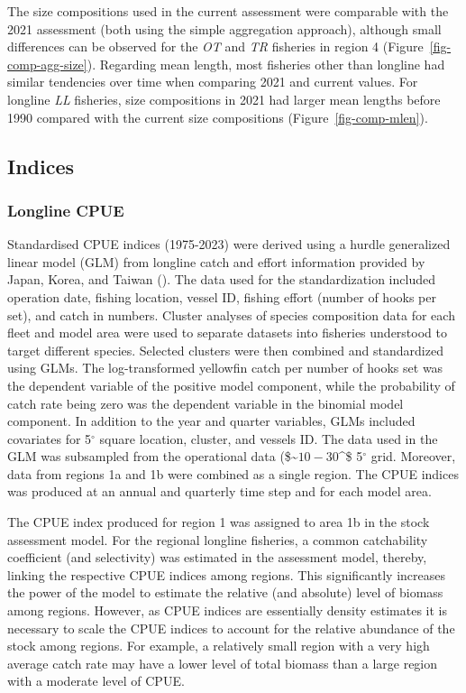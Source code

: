 \documentclass[
]{scrartcl}
\begin{document}
The size compositions used in the current assessment were comparable
with the 2021 assessment (both using the simple aggregation approach),
although small differences can be observed for the \emph{OT} and
\emph{TR} fisheries in region 4 (Figure~\ref{fig-comp-agg-size}).
Regarding mean length, most fisheries other than longline had similar
tendencies over time when comparing 2021 and current values. For
longline \emph{LL} fisheries, size compositions in 2021 had larger mean
lengths before 1990 compared with the current size compositions
(Figure~\ref{fig-comp-mlen}).

\subsection{Indices}\label{indices}

\subsubsection{Longline CPUE}\label{longline-cpue}

Standardised CPUE indices (1975-2023) were derived using a hurdle
generalized linear model (GLM) from longline catch and effort
information provided by Japan, Korea, and Taiwan
().
The data used for the standardization included operation date, fishing
location, vessel ID, fishing effort (number of hooks per set), and catch
in numbers. Cluster analyses of species composition data for each fleet
and model area were used to separate datasets into fisheries understood
to target different species. Selected clusters were then combined and
standardized using GLMs. The log-transformed yellowfin catch per number
of hooks set was the dependent variable of the positive model component,
while the probability of catch rate being zero was the dependent
variable in the binomial model component. In addition to the year and
quarter variables, GLMs included covariates for 5\(^\circ\) square
location, cluster, and vessels ID. The data used in the GLM was
subsampled from the operational data (\$\sim\(10-30%
\)\^{}\circ \times\$ 5\(^\circ\) grid. Moreover, data from regions 1a
and 1b were combined as a single region. The CPUE indices was produced
at an annual and quarterly time step and for each model area.

The CPUE index produced for region 1 was assigned to area 1b in the
stock assessment model. For the regional longline fisheries, a common
catchability coefficient (and selectivity) was estimated in the
assessment model, thereby, linking the respective CPUE indices among
regions. This significantly increases the power of the model to estimate
the relative (and absolute) level of biomass among regions. However, as
CPUE indices are essentially density estimates it is necessary to scale
the CPUE indices to account for the relative abundance of the stock
among regions. For example, a relatively small region with a very high
average catch rate may have a lower level of total biomass than a large
region with a moderate level of CPUE.
\end{document}
